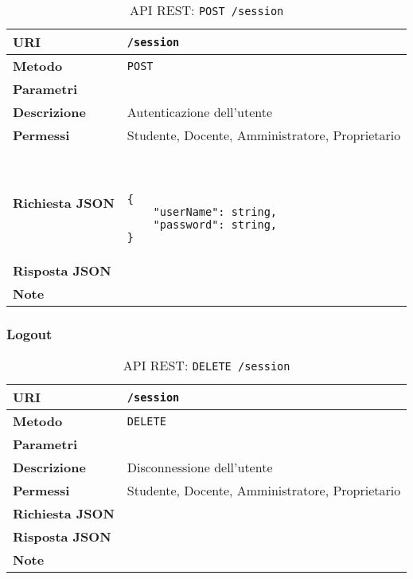         \begin{table}[H]
            \begin{center}
                \begin{tabular}{p{} p{}}
                    \toprule
                    \textbf{URI} & \texttt{/session} \\ \midrule
                    \textbf{Metodo} & \texttt{POST} \\ \midrule
                    \textbf{Parametri} & \\ \midrule
                    \textbf{Descrizione} & Autenticazione dell'utente \\ \midrule
                    \textbf{Permessi} & Studente, Docente, Amministratore, Proprietario  \\ \midrule
                    \textbf{Richiesta JSON} & \
                        \begin{lstlisting}[basicstyle={\ttfamily}]
{
    "userName": string,
    "password": string,
}
                        \end{lstlisting}
                        \\ \midrule
                    \textbf{Risposta JSON} & \\ \midrule
                    \textbf{Note} & \\
                    \bottomrule
                \end{tabular}
                \caption{API REST: \texttt{POST /session}}
            \end{center}
        \end{table}

    \subsubsection{Logout}

        \begin{table}[H]
            \begin{center}
                \begin{tabular}{p{} p{}}
                    \toprule
                    \textbf{URI} & \texttt{/session} \\ \midrule
                    \textbf{Metodo} & \texttt{DELETE} \\ \midrule
                    \textbf{Parametri} & \\ \midrule
                    \textbf{Descrizione} & Disconnessione dell'utente \\ \midrule
                    \textbf{Permessi} & Studente, Docente, Amministratore, Proprietario  \\ \midrule
                    \textbf{Richiesta JSON} & \\ \midrule
                    \textbf{Risposta JSON} & \\ \midrule
                    \textbf{Note} & \\
                    \bottomrule
                \end{tabular}
                \caption{API REST: \texttt{DELETE /session}}
            \end{center}
        \end{table}

